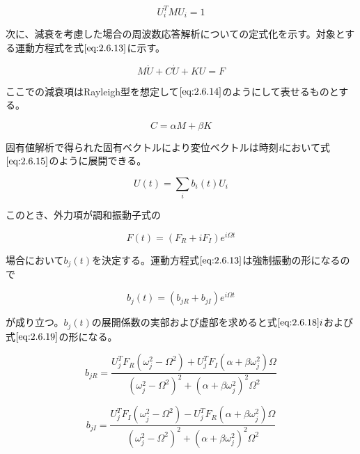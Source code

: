 \documentclass[a4paper,pandoc,ja=standard]{bxjsarticle}
\begin{document}
\begin{equation}
U_i^T M U_i = 1
\label{eq:2.6.12}
\end{equation}

次に、減衰を考慮した場合の周波数応答解析についての定式化を示す。対象とする運動方程式を式\(\eqref{eq:2.6.13}\)に示す。

\begin{equation}
M \ddot{U} + C \dot{U} + K U = F
\label{eq:2.6.13}
\end{equation}

ここでの減衰項はRayleigh型を想定して\(\eqref{eq:2.6.14}\)のようにして表せるものとする。

\begin{equation}
C = \alpha M + \beta K
\label{eq:2.6.14}
\end{equation}

固有値解析で得られた固有ベクトルにより変位ベクトルは時刻\emph{t}において式\(\eqref{eq:2.6.15}\)のように展開できる。

\begin{equation}
U(t) = \sum_i b_i(t) U_i
\label{eq:2.6.15}
\end{equation}

このとき、外力項が調和振動子式の

\begin{equation}
F(t) = ( F_R + i F_I )e^{i \Omega t}
\label{eq:2.6.16}
\end{equation}

場合において\(b_{j}(t)\)を決定する。運動方程式\(\eqref{eq:2.6.13}\)は強制振動の形になるので

\begin{equation}
b_j (t) = (b_{jR} + b_{jI}) e^{i \Omega t}
\label{eq:2.6.17}
\end{equation}

が成り立つ。\(b_{j}(t)\)の展開係数の実部および虚部を求めると式\(\eqref{eq:2.6.18}i\)および式\(\eqref{eq:2.6.19}\)の形になる。

\begin{equation}
b_{jR} = \frac{ U^T_j F_R (\omega^2_j - \Omega^2) + U^T_j F_I (\alpha + \beta \omega_j^2) \Omega}{ (\omega^2_j - \Omega^2)^2 + (\alpha + \beta \omega_j^2)^2 \Omega^2}
\label{eq:2.6.18}
\end{equation}

\begin{equation}
b_{jI} = \frac{ U^T_j F_I(\omega^2_j - \Omega^2) - U^T_j F_R(\alpha + \beta \omega_j^2) \Omega}{ (\omega^2_j - \Omega^2)^2 + (\alpha + \beta \omega_j^2)^2 \Omega^2}
\label{eq:2.6.19}
\end{equation}
\end{document}
